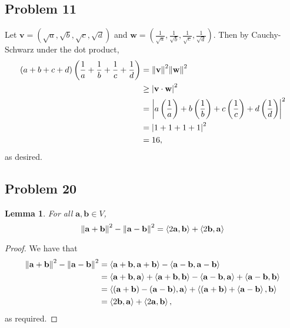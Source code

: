 \documentclass[11pt]{article}
\renewcommand{\vec}[1]{\mathbf{#1}}
\newtheorem{lemma}{Lemma}
\begin{document}
\subsection{Problem 11}

Let $\vec{v} = \left( \sqrt{a}, \sqrt{b}, \sqrt{c}, \sqrt{d} \right)$ and $\vec{w} = \left( \tfrac{1}{\sqrt{a}}, \tfrac{1}{\sqrt{b}}, \tfrac{1}{\sqrt{c}}, \tfrac{1}{\sqrt{d}} \right)$. Then by Cauchy-Schwarz under the dot product,
\begin{align*}
	(a + b + c + d) \left( \frac{1}{a} + \frac{1}{b} + \frac{1}{c} + \frac{1}{d} \right) &= \norm{\vec{v}}^{2} \norm{\vec{w}}^{2} \\
	&\ge \abs{\vec{v} \cdot \vec{w}}^{2} \\
	&= \abs{a \left( \frac{1}{a} \right) + b \left( \frac{1}{b} \right) + c \left( \frac{1}{c} \right) + d \left( \frac{1}{d} \right)}^{2} \\ 
	&= \abs{1 + 1 + 1 + 1}^{2} \\
	&= 16,
\end{align*}
as desired.


\subsection{Problem 20}

\begin{lemma}
	For all $\vec{a}, \vec{b} \in V$,
	\[
		\norm{\vec{a} + \vec{b}}^{2} - \norm{\vec{a} - \vec{b}}^{2} = \ev{2 \vec{a}, \vec{b}} + \ev{2 \vec{b}, \vec{a}}
	\]
\end{lemma}
\begin{adjustwidth}{1cm}{}
	\begin{proof}\renewcommand{\qedsymbol}{}
		We have that 
		\begin{align*}
			\norm{\vec{a} + \vec{b}}^{2} - \norm{\vec{a} - \vec{b}}^{2} &= \ev{\vec{a} + \vec{b}, \vec{a} + \vec{b}} - \ev{\vec{a} - \vec{b}, \vec{a} - \vec{b}} \\
			&= \ev{\vec{a} + \vec{b}, \vec{a}} + \ev{\vec{a} + \vec{b}, \vec{b}} - \ev{\vec{a} - \vec{b}, \vec{a}} + \ev{\vec{a} - \vec{b}, \vec{b}} \\
			&= \ev{(\vec{a} + \vec{b}) - (\vec{a} - \vec{b}), \vec{a}} + \ev{(\vec{a} + \vec{b}) + \ev{\vec{a} - \vec{b}}, \vec{b}} \\
			&= \ev{2 \vec{b}, \vec{a}} + \ev{2 \vec{a}, \vec{b}},
		\end{align*}
		as required.
	\end{proof}
\end{adjustwidth}
\end{document}
